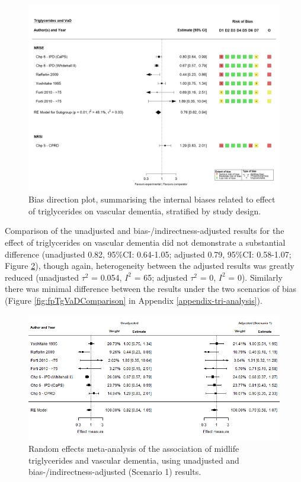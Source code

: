 \documentclass[a4paper, twoside]{templates/ociamthesis}
\begin{document}
\begin{figure}[H]
\includegraphics[width=1\linewidth]{figures/tri/midlife_VaD} \caption[shortcap]{Bias direction plot, summarising the internal biases related to effect of triglycerides on vascular dementia, stratified by study design.}\label{fig:tgVadBiasDirection}
\end{figure}

Comparison of the unadjusted and bias-/indirectness-adjusted results for the effect of triglycerides on vascular dementia did not demonstrate a substantial difference (unadjusted 0.82, 95\%CI: 0.64-1.05; adjusted 0.79, 95\%CI: 0.58-1.07; Figure \ref{fig:fpTgVad}), though again, heterogeneity between the adjusted results was greatly reduced (unadjusted \(\tau^2\) = 0.054, \(I^2\) = 65; adjusted \(\tau^2\) = 0, \(I^2\) = 0). Similarly there was minimal difference between the results under the two scenarios of bias (Figure \ref{fig:fpTgVaDComparison} in Appendix \ref{appendix-tri-analysis}).





\begin{figure}[H]
\includegraphics[width=1\linewidth]{figures/tri/fp_paired_midlife_tg_vad} \caption[shortcap]{Random effects meta-analysis of the association of midlife triglycerides and vascular dementia, using unadjusted and bias-/indirectness-adjusted (Scenario 1) results.}\label{fig:fpTgVad}
\end{figure}
\end{document}
